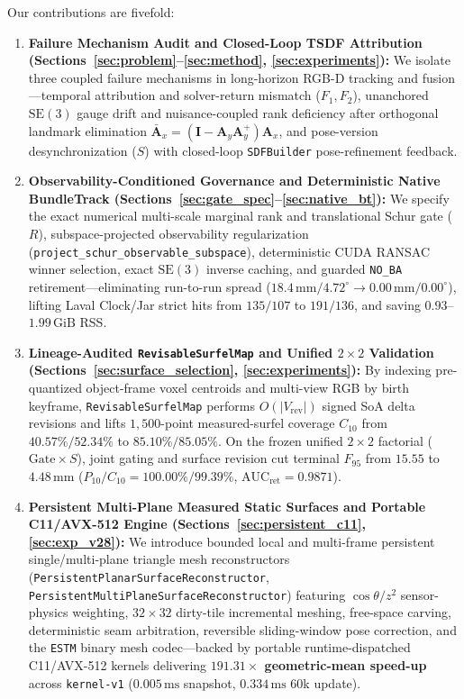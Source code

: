 \documentclass{evidencescene}
\begin{document}
Our contributions are fivefold:
\begin{enumerate}
    \item \textbf{Failure Mechanism Audit and Closed-Loop TSDF Attribution (Sections~\ref{sec:problem}--\ref{sec:method}, \ref{sec:experiments}):} We isolate three coupled failure mechanisms in long-horizon RGB-D tracking and fusion---temporal attribution and solver-return mismatch ($F_1,F_2$), unanchored $\mathrm{SE}(3)$ gauge drift and nuisance-coupled rank deficiency after orthogonal landmark elimination $\bar{\mathbf{A}}_x=(\mathbf{I}-\mathbf{A}_y\mathbf{A}_y^+)\mathbf{A}_x$, and pose-version desynchronization ($S$) with closed-loop \texttt{SDFBuilder} pose-refinement feedback.
    \item \textbf{Observability-Conditioned Governance and Deterministic Native BundleTrack (Sections~\ref{sec:gate_spec}--\ref{sec:native_bt}):} We specify the exact numerical multi-scale marginal rank and translational Schur gate ($R$), subspace-projected observability regularization (\texttt{project\_schur\_observable\_subspace}), deterministic CUDA RANSAC winner selection, exact $\mathrm{SE}(3)$ inverse caching, and guarded \texttt{NO\_BA} retirement---eliminating run-to-run spread ($18.4\,\mathrm{mm}/4.72^\circ\to 0.00\,\mathrm{mm}/0.00^\circ$), lifting Laval Clock/Jar strict hits from $135/107$ to $191/136$, and saving $0.93$--$1.99\,\mathrm{GiB}$ RSS.
    \item \textbf{Lineage-Audited \texttt{RevisableSurfelMap} and Unified $2\times 2$ Validation (Sections~\ref{sec:surface_selection}, \ref{sec:experiments}):} By indexing pre-quantized object-frame voxel centroids and multi-view RGB by birth keyframe, \texttt{RevisableSurfelMap} performs $O(|V_{\mathrm{rev}}|)$ signed SoA delta revisions and lifts $1{,}500$-point measured-surfel coverage $C_{10}$ from $40.57\%/52.34\%$ to $85.10\%/85.05\%$. On the frozen unified $2\times 2$ factorial ($\text{Gate}\times S$), joint gating and surface revision cut terminal $F_{95}$ from $15.55$ to $4.48\,\mathrm{mm}$ ($P_{10}/C_{10}=100.00\%/99.39\%$, $\text{AUC}_{\mathrm{ret}}=0.9871$).
    \item \textbf{Persistent Multi-Plane Measured Static Surfaces and Portable C11/AVX-512 Engine (Sections~\ref{sec:persistent_c11}, \ref{sec:exp_v28}):} We introduce bounded local and multi-frame persistent single/multi-plane triangle mesh reconstructors (\texttt{PersistentPlanarSurfaceReconstructor}, \texttt{PersistentMultiPlaneSurfaceReconstructor}) featuring $\cos\theta/z^2$ sensor-physics weighting, $32\times 32$ dirty-tile incremental meshing, free-space carving, deterministic seam arbitration, reversible sliding-window pose correction, and the \texttt{ESTM} binary mesh codec---backed by portable runtime-dispatched C11/AVX-512 kernels delivering \textbf{$191.31\times$ geometric-mean speed-up} across \texttt{kernel-v1} ($0.005\,\mathrm{ms}$ snapshot, $0.334\,\mathrm{ms}$ 60k update).

\end{enumerate}
\end{document}

